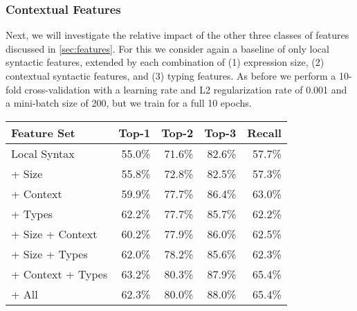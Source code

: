 \subsubsection{Contextual Features}
\label{sec:contextual-features}

Next, we will investigate the relative impact of the other three classes
of features discussed in \autoref{sec:features}.
%
For this we consider again a baseline of only local syntactic features,
extended by each combination of
%
(1) expression size,
(2) contextual syntactic features, and
(3) typing features.
%
As before we perform a 10-fold cross-validation with a learning rate and
L2 regularization rate of 0.001 and a mini-batch size of 200, but we
train for a full 10 epochs.

\begin{table}[ht]
  \begin{minipage}{0.49\linewidth}
  \centering
  \linear
  \begin{tabular}{lrrrr}
    \toprule
    Feature Set                 & Top-1  & Top-2  & Top-3  & Recall \\
    \midrule
    Local Syntax                & 55.0\% & 71.6\% & 82.6\% & 57.7\% \\
    \midrule
    + Size                      & 55.8\% & 72.8\% & 82.5\% & 57.3\% \\
    + Context                   & 59.9\% & 77.7\% & 86.4\% & 63.0\% \\
    + Types                     & 62.2\% & 77.7\% & 85.7\% & 62.2\% \\
    \midrule
    + Size + Context            & 60.2\% & 77.9\% & 86.0\% & 62.5\% \\
    + Size + Types              & 62.0\% & 78.2\% & 85.6\% & 62.3\% \\
    + Context + Types           & 63.2\% & 80.3\% & 87.9\% & 65.4\% \\
    \midrule
    + All                       & 62.3\% & 80.0\% & 88.0\% & 65.4\% \\
    \bottomrule
  \end{tabular}
  \end{minipage}

\end{table}
